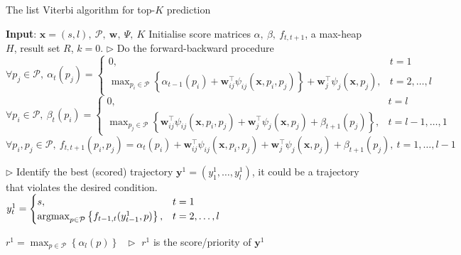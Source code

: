 \begin{algorithm}[htbp]
\caption{The list Viterbi algorithm for top-$K$ prediction~\cite{nilsson2001sequentially}}
\begin{algorithmic}[1]
\STATE \textbf{Input}: $\mathbf{x}=(s, l),~ \mathcal{P},~ \mathbf{w},~ \Psi, ~K$
\STATE Initialise score matrices $\alpha,~ \beta,~ f_{t, t+1}$, a max-heap $H$, result set $R$, $k=0$.
\STATE $\triangleright$ Do the forward-backward procedure \vspace{3pt}
\STATE $\forall p_j \in \mathcal{P},~ \alpha_t(p_j) =
        \begin{cases}
         0, & t = 1 \\
         \max_{p_i \in \mathcal{P}} \left\{ \alpha_{t-1}(p_i) + \mathbf{w}_{ij}^\top \psi_{ij}(\mathbf{x}, p_i, p_j) \right\} +
         \mathbf{w}_j^\top \psi_j(\mathbf{x}, p_j), & t=2,\dots,l
        \end{cases}$\vspace{3pt}
\STATE $\forall p_i \in \mathcal{P},~ \beta_t(p_i) =
         \begin{cases}
          0, & t = l \\
          \max_{p_j \in \mathcal{P}} \left\{ \mathbf{w}_{ij}^\top \psi_{ij}(\mathbf{x}, p_i, p_j) +
          \mathbf{w}_j^\top \psi_j(\mathbf{x}, p_j) + \beta_{t+1}(p_j) \right\}, & t = l-1,\dots,1
         \end{cases}$
\STATE \vspace{3pt}$\forall p_i, p_j \in \mathcal{P},~ f_{t,t+1}(p_i, p_j) = \alpha_t(p_i) + \mathbf{w}_{ij}^\top \psi_{ij}(\mathbf{x}, p_i, p_j) +
                             \mathbf{w}_j^\top \psi_j(\mathbf{x}, p_j) + \beta_{t+1}(p_j),~ t = 1,\dots,l-1$

\STATE \vspace{3pt}$\triangleright$ Identify the best (scored) trajectory $\mathbf{y}^1=(y_1^1,\dots,y_l^1)$, it could be a trajectory that violates the desired condition.
\STATE $y_t^1 = \begin{cases}
                  s, & t = 1 \\
                  \operatorname*{argmax}_{p \in \mathcal{P}} \left\{ f_{t-1,t}(y_{t-1}^1, p) \right\}, & t = 2,\dots,l
                 \end{cases}$

\STATE \vspace{3pt}$r^1 = \max_{p \in \mathcal{P}} \left\{ \alpha_{l}(p) \right\}~~~ \triangleright$ $r^1$ is the score/priority of $\mathbf{y}^1$


\end{algorithmic}
\end{algorithm}
